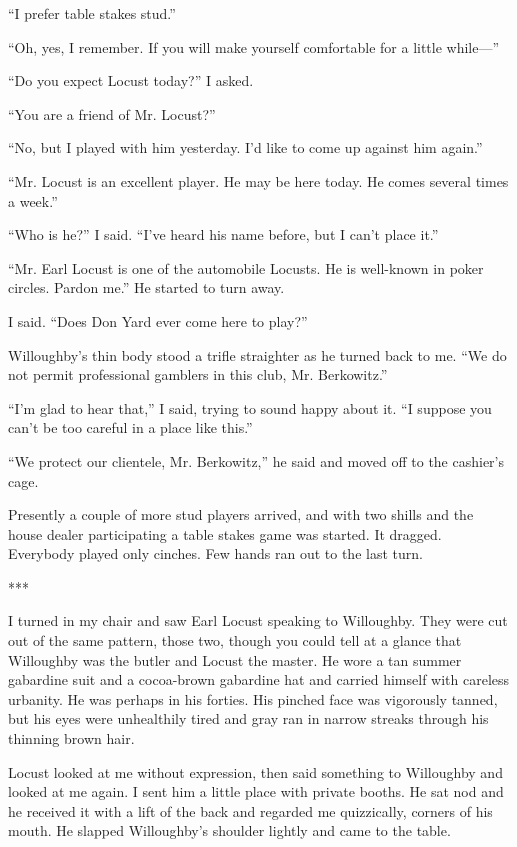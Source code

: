 \documentclass{novel}
\begin{document}
“I prefer table stakes stud.”

“Oh, yes, I remember. If you will make yourself comfortable for a little while—”

“Do you expect Locust today?” I asked.

“You are a friend of Mr. Locust?”

“No, but I played with him yesterday. I’d like to come up against him again.”

“Mr. Locust is an excellent player. He may be here today. He comes several times a week.”

“Who is he?” I said. “I’ve heard his name before, but I can’t place it.”

“Mr. Earl Locust is one of the automobile Locusts. He is well-known in poker circles. Pardon me.” He started to turn away.

I said. “Does Don Yard ever come here to play?”

Willoughby’s thin body stood a trifle straighter as he turned back to me. “We do not permit professional gamblers in this club, Mr. Berkowitz.”

“I’m glad to hear that,” I said, trying to sound happy about it. “I suppose you can’t be too careful in a place like this.”

“We protect our clientele, Mr. Berkowitz,” he said and moved off to the cashier’s cage.

Presently a couple of more stud players arrived, and with two shills and the house dealer participating a table stakes game was started. It dragged. Everybody played only cinches. Few hands ran out to the last turn.

***

I turned in my chair and saw Earl Locust speaking to Willoughby. They were cut out of the same pattern, those two, though you could tell at a glance that Willoughby was the butler and Locust the master. He wore a tan summer gabardine suit and a cocoa-brown gabardine hat and carried himself with careless urbanity. He was perhaps in his forties. His pinched face was vigorously tanned, but his eyes were unhealthily tired and gray ran in narrow streaks through his thinning brown hair.

Locust looked at me without expression, then said something to Willoughby and looked at me again. I sent him a little place with private booths. He sat nod and he received it with a lift of the back and regarded me quizzically, corners of his mouth. He slapped Willoughby’s shoulder lightly and came to the table.
\end{document}
